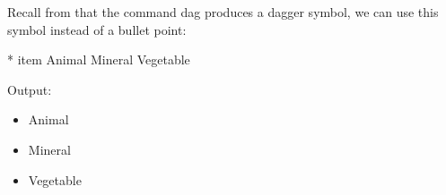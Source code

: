 Recall from  that the command
\gls{dag} produces a dagger symbol, we can use this symbol
instead of a bullet point:
\begin{code}
*\newline
{}\newline
\mbox{}\newline
\gls{item} Animal\newline
\mbox{}\newline
{} Mineral\newline
\mbox{}\newline
{} Vegetable\newline
\mbox{}\newline
{}
\end{code}%
Output:
\begin{result}
\renewcommand*{\labelitemi}{\dag}

\begin{itemize}

\item Animal

\item Mineral

\item Vegetable

\end{itemize}
\end{result}

